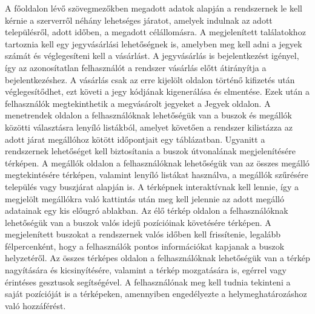 A főoldalon lévő szövegmezőkben megadott adatok alapján a rendszernek le kell kérnie a szerverről néhány lehetséges járatot, amelyek indulnak az adott településről, adott időben, a megadott célállomásra. A megjelenített találatokhoz tartoznia kell egy jegyvásárlási lehetőségnek is, amelyben meg kell adni a jegyek számát és véglegesíteni kell a vásárlást. A jegyvásárlás is bejelentkezést igényel, így az azonosítatlan felhasználót a rendszer vásárlás előtt átirányítja a bejelentkezéshez. A vásárlás csak az erre kijelölt oldalon történő kifizetés után véglegesítődhet, ezt követi a jegy kódjának kigenerálása és elmentése. Ezek után a felhasználók megtekinthetik a megvásárolt jegyeket a Jegyek oldalon. A menetrendek oldalon a felhasználóknak lehetőségük van a buszok és megállók közötti választásra lenyíló listákból, amelyet követően a rendszer kilistázza az adott járat megállóhoz kötött időpontjait egy táblázatban. Ugyanitt a rendszernek lehetőséget kell biztosítania a buszok útvonalának megjelenítésére térképen. A megállók oldalon a felhasználóknak lehetőségük van az összes megálló megtekintésére térképen, valamint lenyíló listákat használva, a megállók szűrésére település vagy buszjárat alapján is. A térképnek interaktívnak kell lennie, így a megjelölt megállókra való kattintás után meg kell jelennie az adott megálló adatainak egy kis előugró ablakban. Az élő térkép oldalon a felhasználóknak lehetőségük van a buszok valós idejű pozícióinak követésére térképen. A megjelenített buszokat a rendszernek valós időben kell frissítenie, legalább félpercenként, hogy a felhasználók pontos információkat kapjanak a buszok helyzetéről. Az összes térképes oldalon a felhasználóknak lehetőségük van a térkép nagyítására és kicsinyítésére, valamint a térkép mozgatására is, egérrel vagy érintéses gesztusok segítségével. A felhasználónak meg kell tudnia tekinteni a saját pozícióját is a térképeken, amennyiben engedélyezte a helymeghatározáshoz való hozzáférést.

